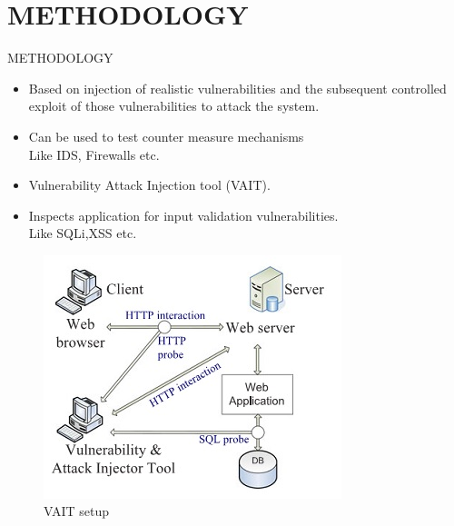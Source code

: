 \documentclass[xcolor=x11names,compress]{beamer}
\renewcommand{\(}{\begin{columns}}
\renewcommand{\)}{\end{columns}}
\newcommand{\<}[1]{\begin{column}{#1}}
\renewcommand{\>}{\end{column}}
\begin{document}
\section{\scshape METHODOLOGY}
\begin{frame}
\end{frame}
\begin{frame}{METHODOLOGY}
\begin{itemize}
	\item Based on injection of realistic vulnerabilities and the
	subsequent controlled exploit of those vulnerabilities to attack the system.
	\newline
	\item Can be  used to test counter measure mechanisms\\
	Like IDS, Firewalls etc.
	\newline
	\item Vulnerability Attack Injection tool (VAIT).
	\newline
	\item Inspects application for input validation vulnerabilities.\\
	Like SQLi,XSS etc.
\end{itemize}
\end{frame}
\begin{frame}

\begin{figure}
\centering
\includegraphics[width=0.7\linewidth]{Main/Fig2}
\caption{VAIT setup}
\label{fig:Fig2}
\end{figure}

\end{frame}
\end{document}
